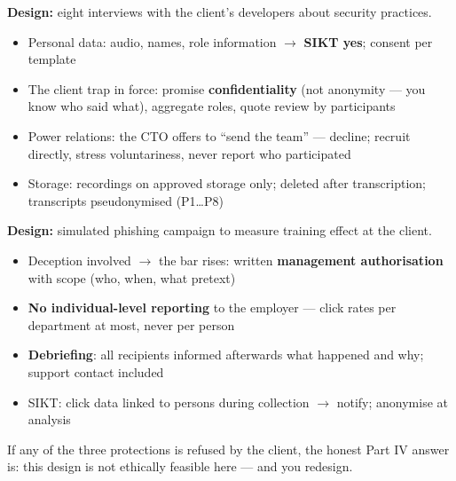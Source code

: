 \documentclass[11pt,a4paper,british,twoside=false,headings=small,chapterprefix=false,numbers=noenddot]{scrbook}
\begin{document}
\begin{center}\small
\small
  \textbf{Design:} eight interviews with the client's developers about
  security practices.
  \begin{itemize}\setlength{\itemsep}{0.35em}
    \item Personal data: audio, names, role information $\rightarrow$
          \textbf{SIKT yes}; consent per template
    \item The client trap in force: promise \textbf{confidentiality} (not
          anonymity --- you know who said what), aggregate roles, quote
          review by participants
    \item Power relations: the CTO offers to ``send the team'' --- decline;
          recruit directly, stress voluntariness, never report who
          participated
    \item Storage: recordings on approved storage only; deleted after
          transcription; transcripts pseudonymised (P1\dots P8)
  \end{itemize}
\end{center}

\begin{center}\small
\small
  \textbf{Design:} simulated phishing campaign to measure training effect at
  the client.
  \begin{itemize}\setlength{\itemsep}{0.35em}
    \item Deception involved $\rightarrow$ the bar rises: written
          \textbf{management authorisation} with scope (who, when, what
          pretext)
    \item \textbf{No individual-level reporting} to the employer --- click
          rates per department at most, never per person
    \item \textbf{Debriefing}: all recipients informed afterwards what
          happened and why; support contact included
    \item SIKT: click data linked to persons during collection
          $\rightarrow$ notify; anonymise at analysis
  \end{itemize}
  
  If any of the three protections is refused by the client, the honest
  Part IV answer is: this design is not ethically feasible here --- and you
  redesign.
\end{center}
\end{document}
